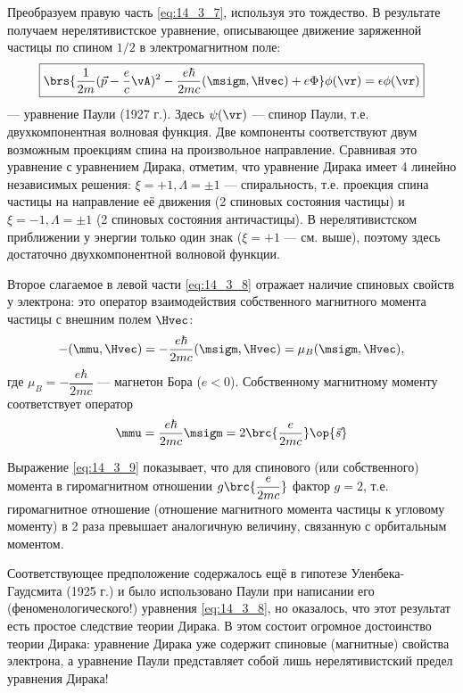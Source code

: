 Преобразуем правую часть \eqref{eq:14_3_7}, используя это тождество. В результате получаем нерелятивистское уравнение, описывающее движение заряженной частицы по спином $1/2$ в электромагнитном поле:
\begin{equation}
\label{eq:14_3_8}
\boxed{\brs{\frac{1}{2m} (\vec{p} - \frac{e}{c} \vA)^2 - \frac{e\hbar}{2mc} (\msigm, \Hvec) + e\Phi}\phi(\vr) = \epsilon \phi(\vr)}
\end{equation}
--- уравнение Паули (1927 г.). Здесь $\psi(\vr)$ --- спинор Паули, т.е. двухкомпонентная волновая функция. Две компоненты соответствуют двум возможным проекциям спина на произвольное направление. Сравнивая это уравнение с уравнением Дирака, отметим, что уравнение Дирака имеет 4 линейно независимых решения: $\xi = +1, \Lambda = \pm 1$ --- спиральность, т.е. проекция спина частицы на направление её движения (2 спиновых состояния частицы) и $\xi = -1, \Lambda = \pm 1$ (2 спиновых состояния античастицы). В нерелятивистском приближении у энергии только один знак ($\xi = +1$ --- см. выше), поэтому здесь достаточно двухкомпонентной волновой функции.

Второе слагаемое в левой части \eqref{eq:14_3_8} отражает наличие спиновых свойств у электрона: это оператор взаимодействия собственного магнитного момента частицы с внешним полем $\Hvec$:
$$
- (\mmu, \Hvec) = - \frac{e\hbar}{2mc}(\msigm, \Hvec) = \mu_B (\msigm, \Hvec), 
$$
где $\mu_B = -\dfrac{e\hbar}{2mc}$ --- магнетон Бора ($e < 0$). Собственному магнитному моменту соответствует оператор
\begin{equation}
\label{eq:14_3_9}
\mmu = \frac{e\hbar}{2mc} \msigm = 2 \brc{\frac{e}{2mc}}\op{\vec{s}}
\end{equation}

Выражение \eqref{eq:14_3_9} показывает, что для спинового (или собственного) момента в гиромагнитном отношении $g\brc{\dfrac{e}{2mc}}$ фактор $g = 2$, т.е. гиромагнитное отношение (отношение магнитного момента частицы к угловому моменту) в 2 раза превышает аналогичную величину, связанную с орбитальным моментом.

Соответствующее предположение содержалось ещё в гипотезе Уленбека-Гаудсмита (1925 г.) и было использовано Паули при написании его (феноменологического!) уравнения \eqref{eq:14_3_8}, но оказалось, что этот результат есть простое следствие теории Дирака. В этом состоит огромное достоинство теории Дирака: уравнение Дирака уже содержит спиновые (магнитные) свойства электрона, а уравнение Паули представляет собой лишь нерелятивистский предел уравнения Дирака!

